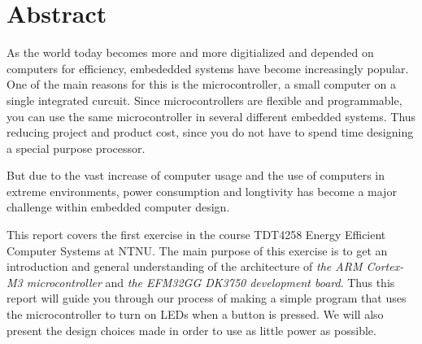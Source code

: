 	\section*{Abstract}

As the world today becomes more and more digitialized and depended on computers for efficiency,
embededded systems have become  increasingly popular. One of the main reasons for this is the
microcontroller, a small computer on a single integrated curcuit. Since microcontrollers are flexible 
and programmable, you can use the same microcontroller in several different embedded systems. Thus reducing
project and product cost, since you do not have to spend time designing a special purpose processor. 

But due to the vast increase of computer usage and the use of computers in extreme environments, power consumption 
and longtivity has become a major challenge within embedded computer design. 


This report covers the first exercise in the course TDT4258 Energy Efficient Computer Systems at NTNU. The
main purpose of this exercise is to get an introduction and general understanding of the architecture of \textit{the 
ARM Cortex-M3 microcontroller} and \textit{the EFM32GG DK3750 development board}. Thus this report will guide you through our 
process of making a simple program that uses the microcontroller to turn on LEDs when a button is pressed. We will also
present the design choices made in order to use as little power as possible. 




